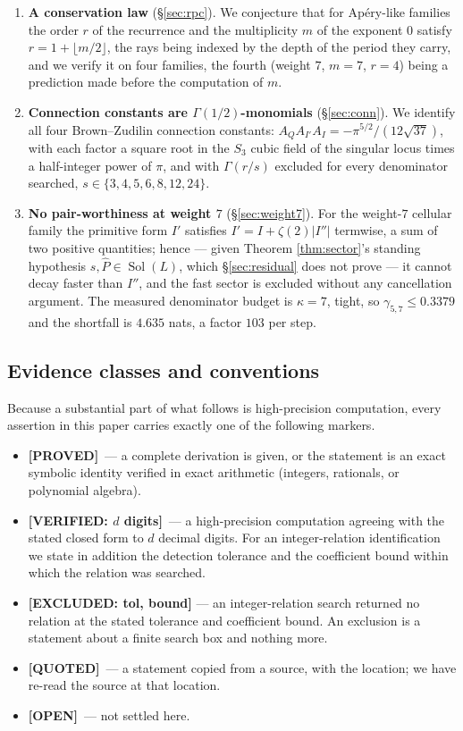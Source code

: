 \documentclass[11pt,reqno]{amsart}
\theoremstyle{plain}
\theoremstyle{definition}
\theoremstyle{remark}
\newcommand{\PROVED}{{\normalfont\sffamily\bfseries[PROVED]}}
\newcommand{\VER}[1]{{\normalfont\sffamily\bfseries[VERIFIED: #1]}}
\newcommand{\EXCL}[1]{{\normalfont\sffamily\bfseries[EXCLUDED: #1]}}
\newcommand{\OPEN}{{\normalfont\sffamily\bfseries[OPEN]}}
\newcommand{\QUOTEDMARK}{{\normalfont\sffamily\bfseries[QUOTED]}}
\DeclareMathOperator{\Sol}{Sol}
\newcommand{\Phat}{\widehat{P}}
\begin{document}
\begin{enumerate}[label=\textbf{(\arabic*)},leftmargin=2.6em]
\item \textbf{A conservation law} (\S\ref{sec:rpc}). We conjecture that for Ap\'ery-like
families the order $r$ of the recurrence and the multiplicity $m$ of the exponent $0$ satisfy
$r=1+\lfloor m/2\rfloor$, the rays being indexed by the depth of the period they carry, and we
verify it on four families, the fourth (weight $7$, $m=7$, $r=4$) being a prediction made before
the computation of $m$.

\item \textbf{Connection constants are $\Gamma(1/2)$-monomials} (\S\ref{sec:conn}). We identify
all four Brown--Zudilin connection constants:
$A_QA_{I'}A_I=-\pi^{5/2}/(12\sqrt{37})$, with each factor a square root in the $S_3$ cubic field
of the singular locus times a half-integer power of $\pi$, and with $\Gamma(r/s)$ excluded for
every denominator searched, $s\in\{3,4,5,6,8,12,24\}$.

\item \textbf{No pair-worthiness at weight $7$} (\S\ref{sec:weight7}). For the weight-$7$
cellular family the primitive form $I'$ satisfies $I'=I+\zeta(2)|I''|$ termwise, a sum of two
positive quantities; hence --- given Theorem \ref{thm:sector}'s standing hypothesis
$s,\Phat\in\Sol(L)$, which \S\ref{sec:residual} does not prove --- it cannot decay faster than
$I''$, and the fast sector is excluded without any cancellation argument. The measured denominator budget is $\kappa=7$, tight, so
$\gamma_{5,7}\le 0.3379$ and the shortfall is $4.635$ nats, a factor $103$ per step.

\end{enumerate}

\subsection{Evidence classes and conventions}\label{sec:conventions}
Because a substantial part of what follows is high-precision computation, every assertion in
this paper carries exactly one of the following markers.

\begin{itemize}[leftmargin=2.2em]
\item \PROVED\ --- a complete derivation is given, or the statement is an exact symbolic
identity verified in exact arithmetic (integers, rationals, or polynomial algebra).
\item \VER{$d$ digits}\ --- a high-precision computation agreeing with the stated closed form to
$d$ decimal digits. For an integer-relation identification we state in addition the detection
tolerance and the coefficient bound within which the relation was searched.
\item \EXCL{tol, bound} --- an integer-relation search returned no relation at the stated
tolerance and coefficient bound. An exclusion is a statement about a finite search box and
nothing more.
\item \QUOTEDMARK\ --- a statement copied from a source, with the location; we have re-read the
source at that location.
\item \OPEN\ --- not settled here.
\end{itemize}
\end{document}
